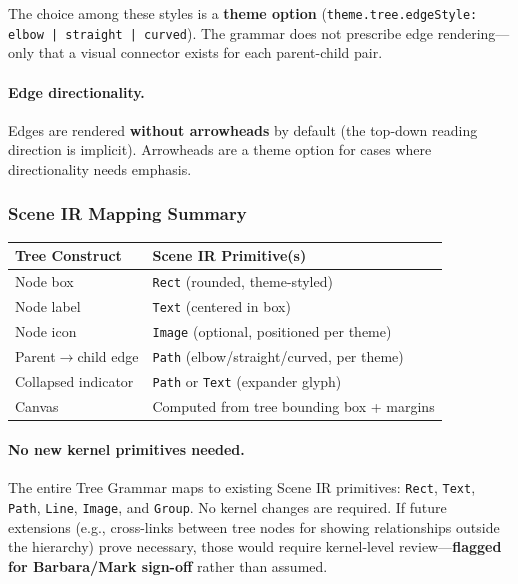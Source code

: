 The choice among these styles is a \textbf{theme option} (\texttt{theme.tree.edgeStyle: elbow | straight | curved}). The grammar does not prescribe edge rendering---only that a visual connector exists for each parent-child pair.

\paragraph{Edge directionality.}
Edges are rendered \textbf{without arrowheads} by default (the top-down reading direction is implicit). Arrowheads are a theme option for cases where directionality needs emphasis.

\subsubsection{Scene IR Mapping Summary}

\begin{center}
\small
\begin{tabular}{lp{8cm}}
\toprule
\textbf{Tree Construct} & \textbf{Scene IR Primitive(s)} \\
\midrule
Node box & \texttt{Rect} (rounded, theme-styled) \\
Node label & \texttt{Text} (centered in box) \\
Node icon & \texttt{Image} (optional, positioned per theme) \\
Parent$\rightarrow$child edge & \texttt{Path} (elbow/straight/curved, per theme) \\
Collapsed indicator & \texttt{Path} or \texttt{Text} (expander glyph) \\
Canvas & Computed from tree bounding box + margins \\
\bottomrule
\end{tabular}
\end{center}

\paragraph{No new kernel primitives needed.}
The entire Tree Grammar maps to existing Scene IR primitives: \texttt{Rect}, \texttt{Text}, \texttt{Path}, \texttt{Line}, \texttt{Image}, and \texttt{Group}. No kernel changes are required. If future extensions (e.g., cross-links between tree nodes for showing relationships outside the hierarchy) prove necessary, those would require kernel-level review---\textbf{flagged for Barbara/Mark sign-off} rather than assumed.

